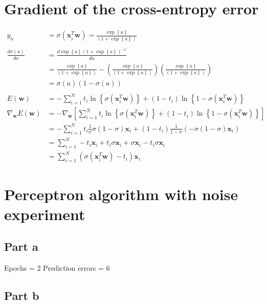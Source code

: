 \documentclass{article}
\newcommand{\diff}[2]{
        \frac{d #1}{d #2}
}
\begin{document}
\section{Gradient of the cross-entropy error}
\begin{align*}
y_n &= \sigma(\bm{x}_{i}^{T}\bm{w})=\frac{\exp\left\{ a \right\}}{\left( 1+\exp\left\{ a\right\} \right)}\\
&\nonumber\\
\diff{\sigma(a)}{a} &= \diff{\exp\left\{ a \right\} \left( 1+\exp\left\{ a\right\} \right)^{-1}}{a}\\
		    &= \frac{\exp\left\{ a \right\}}{\left( 1+\exp\left\{ a\right\} \right)} -
		       \left( 
			\frac{\exp\left\{ a \right\}}{\left( 1+\exp\left\{ a\right\} \right)}
		       \right)
		       \left(
			\frac{\exp\left\{ a \right\}}{\left( 1+\exp\left\{ a\right\} \right)}
		       \right)\\
		    &= \sigma(a)\left(1-\sigma(a)\right)\\
&\nonumber\\
E(\bm{w}) &= -\sum_{i=1}^N t_i \ln\left\{ \sigma(\bm{x}_{i}^{T} \bm{w}) \right\} + (1-t_i)\ln\left\{1-\sigma(\bm{x}_{i}^{T}\bm{w})\right\}\\
\nabla_{\bm{w}} E(\bm{w}) &= -\nabla_{\bm{w}}\left[\sum_{i=1}^N t_i \ln\left\{ \sigma(\bm{x}_{i}^{T}\bm{w}) \right\} + (1-t_i)\ln\left\{1-\sigma(\bm{x}_{i}^{T}\bm{w})\right\}\right]\\
&=-\sum_{i=1}^N t_i \frac{1}{\sigma} \sigma(1-\sigma)\bm{x}_{i} + (1-t_i) \frac{1}{1-\sigma} \left(-\sigma(1-\sigma)\bm{x}_{i}\right)\\
&=\sum_{i=1}^{N} -t_i \bm{x}_{i} + t_i \sigma \bm{x}_{i} + \sigma \bm{x}_{i} - t_i \sigma \bm{x}_{i}\\
&=\sum_{i=1}^{N} (\sigma(\bm{x}_{i}^{T}\bm{w}) - t_i)\bm{x}_{i}
\end{align*}

\clearpage
\section{Perceptron algorithm with noise experiment}

\subsection*{Part a}
Epochs = 2
Prediction errors = 6

\subsection*{Part b}
\end{document}
